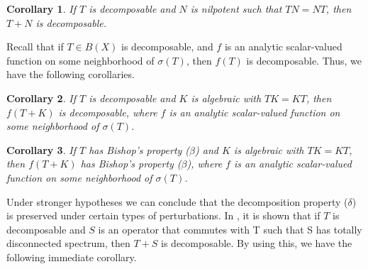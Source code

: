 \documentclass[12pt,a4paper]{amsart}
\newtheorem{corollary}{Corollary}[section]
\begin{document}
 \begin{corollary} If $T$ is decomposable and $N$ is nilpotent
such that $TN = NT$, then $T + N$ is decomposable.
\end{corollary}
Recall \cite{5} that if $T\in B(X)$ is decomposable, and $f$ is an
analytic scalar-valued function on some neighborhood of
$\sigma(T)$, then $f(T)$ is decomposable. Thus, we have the
following corollaries.
\begin{corollary} If $T$ is decomposable and
$K$ is algebraic with $TK = KT$, then $f(T + K)$ is decomposable,
where $f$ is an analytic scalar-valued function on some
neighborhood of $\sigma(T)$.
\end{corollary}
\begin{corollary} If $T$ has Bishop's property ($\beta$) and $K$ is algebraic with $TK =
KT$, then $f(T + K)$ has Bishop's property ($\beta$), where $f$ is
an analytic scalar-valued function on some neighborhood of
$\sigma(T)$.
\end{corollary}
Under stronger hypotheses we can conclude that the decomposition
property ($\delta$) is preserved under certain types of
perturbations. In \cite{16}, it is shown that if $T$ is
decomposable and $S$ is an operator that commutes with T such that
S has totally disconnected spectrum, then $T + S$ is decomposable.
By using this, we have the following immediate corollary.
\end{document}
